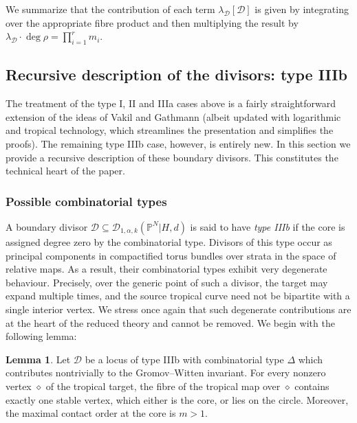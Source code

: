 \documentclass[11pt]{amsart}
\newcommand{\PP}{\mathbb P}
\newcommand{\Dcal}{\mathcal{D}}
\theoremstyle{definition}
\newtheorem{lemma}[thm]{Lemma}
\theoremstyle{definition}
\begin{document}
We summarize that the contribution of each term $\lambda_\Dcal [\Dcal]$ is given by integrating over the appropriate fibre product and then multiplying the result by $\lambda_\Dcal \cdot \deg\rho = \prod_{i=1}^r m_i$.

\subsection{Recursive description of the divisors: type IIIb}\label{subsection C0 splitting} The treatment of the type I, II and IIIa cases above is a fairly straightforward extension of the ideas of Vakil and Gathmann (albeit updated with logarithmic and tropical technology, which streamlines the presentation and simplifies the proofs). The remaining type IIIb case, however, is entirely new. In this section we provide a recursive description of these boundary divisors. This constitutes the technical heart of the paper.

\subsubsection{Possible combinatorial types} A boundary divisor $\Dcal \subseteq \Dcal_{1,\alpha,k}(\PP^N|H,d)$ is said to have \textit{type IIIb} if the core is assigned degree zero by the combinatorial type. Divisors of this type occur as principal components in compactified torus bundles over strata in the space of relative maps. As a result, their combinatorial types exhibit very degenerate behaviour. Precisely, over the generic point of such a divisor, the target may expand multiple times, and the source tropical curve need not be bipartite with a single interior vertex. We stress once again that such degenerate contributions are at the heart of the reduced theory and cannot be removed.  We begin with the following lemma:
\begin{lemma} \label{lemma type C0 combinatorial types}
Let $\Dcal$ be a locus of type IIIb with combinatorial type $\Delta$ which contributes nontrivially to the Gromov--Witten invariant. For every nonzero vertex $\diamond$ of the tropical target, the fibre of the tropical map over $\diamond$ contains exactly one stable vertex, which either is the core, or lies on the circle. Moreover, the maximal contact order at the core is $m>1$.
\end{lemma}
\end{document}
